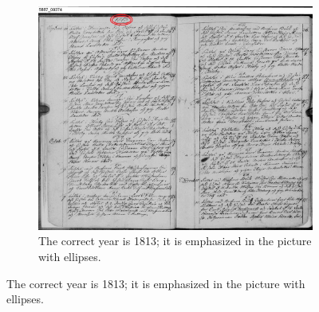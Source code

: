 
\begin{figure}
    \centering
    \begin{subfigure}[c]{1.0\textwidth}
        \centering    \includegraphics[scale=0.56]{resources/SWE_attention/S3HT-64P3-T61.jpg}
        \caption{The correct year is 1813; it is emphasized in the picture with ellipses.}
    \end{subfigure}

    \vspace{1em}


\end{figure}
